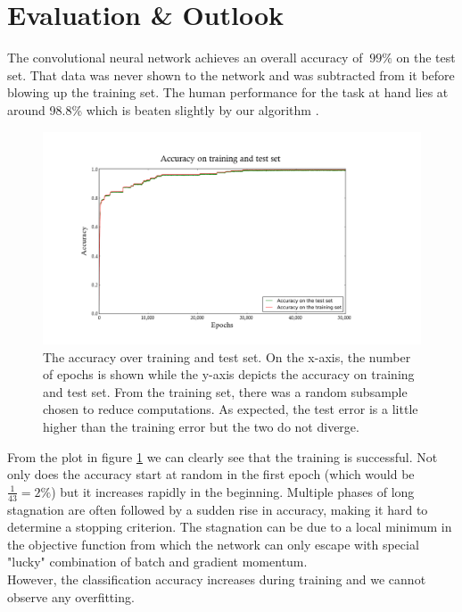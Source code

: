 \documentclass[11pt,a4paper]{article}
\begin{document}
\section{Evaluation \& Outlook}
The convolutional neural network achieves an overall accuracy of $~99 \%$ on the test set. That data was never shown to the network and was subtracted from it before blowing up the training set. The human performance for the task at hand lies at around 98.8\% which is beaten slightly by our algorithm \cite{stallkamp2012man}.\\
\begin{figure}[h!]
	\includegraphics[width=\textwidth]{accuracy.png}
	\centering
	\caption[Accuracy]{The accuracy over training and test set. On the x-axis, the number of epochs is shown while the y-axis depicts the accuracy on training and test set. From the training set, there was a random subsample chosen to reduce computations. As expected, the test error is a little higher than the training error but the two do not diverge.
}
	\label{fig:accuracy}
\end{figure}
From the plot in figure \ref{fig:accuracy} we can clearly see that the training is successful. Not only does the accuracy start at random in the first epoch (which would be $\frac{1}{43} = 2 \%$) but it increases rapidly in the beginning. Multiple phases of long stagnation are often followed by a sudden rise in accuracy, making it hard to determine a stopping criterion. The stagnation can be due to a local minimum in the objective function from which the network can only escape with special "lucky" combination of batch and gradient momentum.\\
However, the classification accuracy increases during training and we cannot observe any overfitting. 
\end{document}
